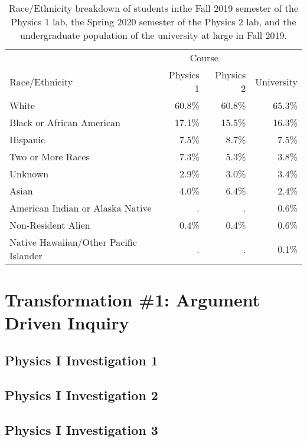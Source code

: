 \documentclass[aip, numerical, preprint]{revtex4-2}
\begin{document}
\begin{table}
  \centering
  \begin{tabular}{lrrr}
    \hline\hline
                                            &\multicolumn{2}{c}{Course}\\
    Race/Ethnicity                          &Physics 1  &Physics 2 &University\\
    \hline
    White                                   &60.8\%     &60.8\%    &65.3\%\\
    Black or African American               &17.1\%     &15.5\%    &16.3\%\\
    Hispanic                                &7.5\%      &8.7\%     &7.5\%\\
    Two or More Races                       &7.3\%      &5.3\%     &3.8\%\\
    Unknown                                 &2.9\%      &3.0\%     &3.4\%\\
    Asian                                   &4.0\%      &6.4\%     &2.4\%\\
    American Indian or Alaska Native        &.	        &.         &0.6\%\\
    Non-Resident Alien	                    &0.4\%      &0.4\%     &0.6\%\\
    Native Hawaiian/Other Pacific Islander  &.	        &.         &0.1\%\\
    \hline\hline
  \end{tabular}
  \caption{Race/Ethnicity breakdown of students inthe Fall 2019 semester of the Physics 1 lab,
    the Spring 2020 semester of the Physics 2 lab, and the undergraduate population of the
    university at large in Fall 2019.}
  \label{tab:race}
\end{table}

\section{Transformation \#1: Argument Driven Inquiry}
\subsection{Physics \textrm{I} Investigation 1}

\subsection{Physics \textrm{I} Investigation 2}

\subsection{Physics \textrm{I} Investigation 3}
\end{document}
